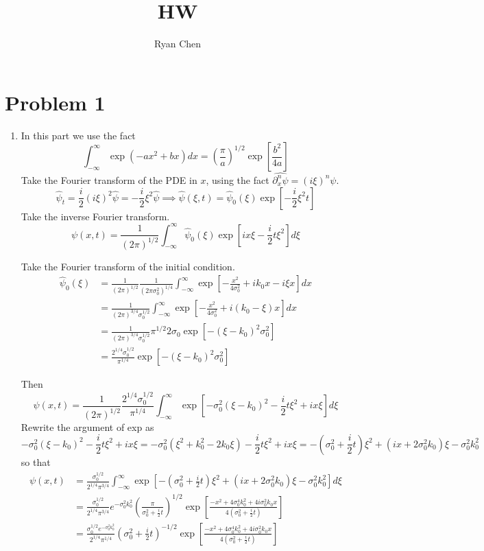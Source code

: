 \documentclass{article}
\title{HW}
\author{Ryan Chen}
\newcommand{\br}[1]{\left(#1\right)}
\newcommand{\imp}{\implies}
\newcommand{\ptl}{\partial}
\begin{document}
	
\maketitle

\section*{Problem 1}

\begin{enumerate}[label=(\alph*)]
	
\item
In this part we use the fact
$$\int_{-\infty}^{\infty}\exp(-ax^2+bx)dx = \br{\frac\pi a}^{1/2}\exp[\frac{b^2}{4a}]$$
Take the Fourier transform of the PDE in $x$, using the fact $\hat{\ptl_x^n\psi}=(i\xi)^n\psi$.
$$\hat\psi_t = \frac i2(i\xi)^2\hat\psi = -\frac i2\xi^2\hat\psi
\imp \hat\psi(\xi,t) = \hat\psi_0(\xi)\exp[-\frac i2\xi^2t]$$
Take the inverse Fourier transform.
$$\psi(x,t) = \frac{1}{(2\pi)^{1/2}}\int_{-\infty}^{\infty} \hat\psi_0(\xi)\exp[ix\xi - \frac i2t\xi^2]d\xi$$

Take the Fourier transform of the initial condition.
\begin{align*}
	\hat\psi_0(\xi) &= \frac{1}{(2\pi)^{1/2}}\frac{1}{(2\pi \sigma_0^2)^{1/4}}\int_{-\infty}^{\infty} \exp[-\frac{x^2}{4\sigma_0^2} + ik_0x - i\xi x]dx\\
	&= \frac{1}{(2\pi)^{3/4}\sigma_0^{1/2}}\int_{-\infty}^{\infty} \exp[-\frac{x^2}{4\sigma_0^2} + i(k_0-\xi)x]dx\\
	&= \frac{1}{(2\pi)^{3/4}\sigma_0^{1/2}}\pi^{1/2}2\sigma_0\exp[-(\xi-k_0)^2\sigma_0^2]\\
	&= \frac{2^{1/4}\sigma_0^{1/2}}{\pi^{1/4}}\exp[-(\xi-k_0)^2\sigma_0^2]
\end{align*}

Then
$$\psi(x,t) = \frac{1}{(2\pi)^{1/2}}\frac{2^{1/4}\sigma_0^{1/2}}{\pi^{1/4}}\int_{-\infty}^{\infty}\exp[-\sigma_0^2(\xi-k_0)^2 - \frac i2t\xi^2 + ix\xi]d\xi$$
Rewrite the argument of exp as
$$-\sigma_0^2(\xi-k_0)^2 - \frac i2t\xi^2 + ix\xi
= -\sigma_0^2(\xi^2+k_0^2-2k_0\xi) - \frac i2t\xi^2 + ix\xi
= -\br{\sigma_0^2 + \frac i2t}\xi^2 + (ix + 2\sigma_0^2k_0)\xi - \sigma_0^2k_0^2$$
so that
\begin{align*}
	\psi(x,t) &= \frac{\sigma_0^{1/2}}{2^{1/4}\pi^{3/4}}\int^{\infty}_{-\infty}\exp[-\br{\sigma_0^2 + \frac i2t}\xi^2 + (ix + 2\sigma_0^2k_0)\xi - \sigma_0^2k_0^2]d\xi\\
	&= \frac{\sigma_0^{1/2}}{2^{1/4}\pi^{3/4}}e^{-\sigma_0^2k_0^2}\br{\frac{\pi}{\sigma_0^2+\frac i2t}}^{1/2}\exp[\frac{-x^2 + 4\sigma_0^4k_0^2 + 4i\sigma_0^2k_0x}{4\br{\sigma_0^2 + \frac i2t}}]\\
	&= \frac{\sigma_0^{1/2}e^{-\sigma_0^2k_0^2}}{2^{1/4}\pi^{1/4}}\br{\sigma_0^2+\frac i2t}^{-1/2}\exp[\frac{-x^2 + 4\sigma_0^4k_0^2 + 4i\sigma_0^2k_0x}{4\br{\sigma_0^2 + \frac i2t}}]
\end{align*}



\end{enumerate}
\end{document}
